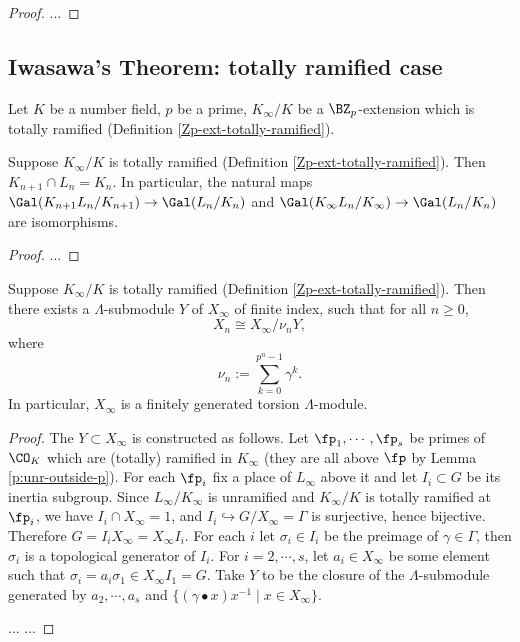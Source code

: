 \begin{proof}
...
\end{proof}

\subsection{Iwasawa's Theorem: totally ramified case}

Let $K$ be a number field, $p$ be a prime,
$K_\infty/K$ be a $\BZ_p$-extension which is totally ramified
(Definition \ref{Zp-ext-totally-ramified}).

\begin{lem}
\label{isom-of-totally-ramified}
Suppose $K_\infty/K$ is totally ramified
(Definition \ref{Zp-ext-totally-ramified}).
Then $K_{n+1}\cap L_n=K_n$. In particular,
the natural maps
$\Gal(K_{n+1}L_n/K_{n+1})\to\Gal(L_n/K_n)$ and
$\Gal(K_\infty L_n/K_\infty)\to\Gal(L_n/K_n)$
are isomorphisms.
\end{lem}

\begin{proof}
...
\end{proof}

\begin{thm}
\label{Xn-isom-qout-of-totally-ramified}
Suppose $K_\infty/K$ is totally ramified
(Definition \ref{Zp-ext-totally-ramified}).
Then there exists a $\Lambda$-submodule $Y$ of $X_\infty$ of finite index,
such that for all $n\geq 0$,
$$
X_n\cong X_\infty/\nu_nY,
$$
where
$$
\nu_n:=\sum_{k=0}^{p^n-1}\gamma^k.
$$
In particular, $X_\infty$ is a finitely generated torsion $\Lambda$-module.
\end{thm}

\begin{proof}
The $Y\subset X_\infty$ is constructed as follows.
Let $\fp_1,\cdots,\fp_s$ be primes of $\CO_K$ which are (totally) ramified in $K_\infty$
(they are all above $\fp$ by Lemma \ref{p:unr-outside-p}).
For each $\fp_i$ fix a place of $L_\infty$ above it and
let $I_i\subset G$ be its inertia subgroup.
Since $L_\infty/K_\infty$ is unramified
and $K_\infty/K$ is totally ramified at $\fp_i$, we have $I_i\cap X_\infty=1$,
and $I_i\hookrightarrow G/X_\infty=\Gamma$ is surjective, hence bijective.
Therefore $G=I_iX_\infty=X_\infty I_i$.
For each $i$ let $\sigma_i\in I_i$ be the preimage of $\gamma\in\Gamma$,
then $\sigma_i$ is a topological generator of $I_i$.
For $i=2,\cdots,s$, let $a_i\in X_\infty$ be some element such that
$\sigma_i=a_i\sigma_1\in X_\infty I_1=G$.
Take $Y$ to be the closure of the $\Lambda$-submodule generated by
$a_2,\cdots,a_s$ and $\{(\gamma\bullet x)x^{-1}\mid x\in X_\infty\}$.

... ...
\end{proof}

